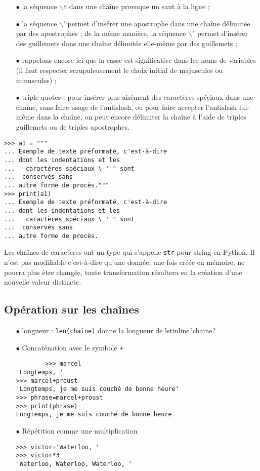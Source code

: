 \begin{itemize}
	\item[$\bullet$] la séquence $\backslash$\lstinline?n? dans une chaîne provoque un saut à la ligne ;
	\item[$\bullet$] la séquence $\backslash$' permet d'insérer une apostrophe dans une chaîne délimitée par des apostrophes ; de la même manière, la séquence $\backslash$" permet d'insérer des guillemets dans une chaîne délimitée elle-même par des guillemets ;
	\item[$\bullet$] rappelons encore ici que la casse est significative dans les noms de variables (il faut respecter scrupuleusement le choix initial de majuscules ou minuscules) ;
	\item[$\bullet$] triple quotes :  pour insérer plus aisément des caractères spéciaux  dans une chaîne, sans faire usage de l'antislash, ou pour faire accepter l'antislash lui-même dans la chaîne, on peut encore délimiter la chaîne à l'aide de triples guillemets ou de triples apostrophes.
\end{itemize}
\begin{lstlisting}
>>> a1 = """
... Exemple de texte préformaté, c'est-à-dire
... dont les indentations et les
...   caractères spéciaux \ ' " sont
...  conservés sans
... autre forme de procès."""
>>> print(a1)
... Exemple de texte préformaté, c'est-à-dire
... dont les indentations et les
...   caractères spéciaux \ ' " sont
...  conservés sans
... autre forme de procès.
\end{lstlisting}
Les chaînes de caractères ont un type qui s'appelle \lstinline?str? pour string en Python. Il n'est pas modifiable c'est-à-dire  qu'une donnée, une fois créée en mémoire, ne pourra plus être changée, toute transformation résultera en la création d'une nouvelle valeur distincte.
\subsection{Opération sur les chaînes}
\begin{itemize}
	\item[$\bullet$] longueur : \lstinline?len(chaine)? donne la longueur de lstinline?chaine?
		\item[$\bullet$] Concaténation avec le symbole \lstinline?+?
		\begin{lstlisting}
		>>> marcel
'Longtemps, '
>>> marcel+proust
'Longtemps, je me suis couché de bonne heure'
>>> phrase=marcel+proust
>>> print(phrase)
Longtemps, je me suis couché de bonne heure
		\end{lstlisting}
		\item[$\bullet$] Répétition comme une multiplication
	\begin{lstlisting}
>>> victor='Waterloo, '
>>> victor*3
'Waterloo, Waterloo, Waterloo, '
		\end{lstlisting}
	\end{itemize}
